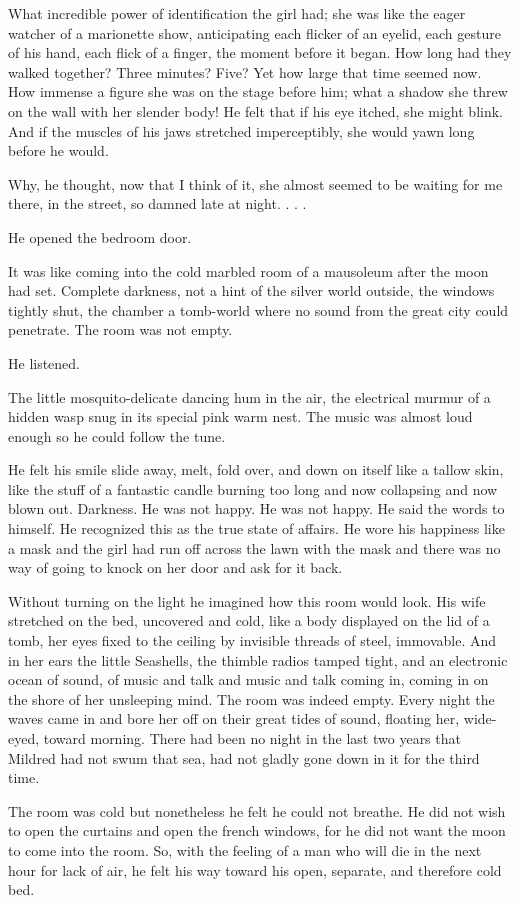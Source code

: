 \documentclass[10pt,a4paper]{article}
\begin{document}
What incredible power of identification the girl had; 
she was like the eager watcher of a marionette show, 
anticipating each flicker of an eyelid, each gesture of his 
hand, each flick of a finger, the moment before it began. 
How long had they walked together? Three minutes? Five? 
Yet how large that time seemed now. How immense a figure 
she was on the stage before him; what a shadow she threw 
on the wall with her slender body! He felt that if his eye 
itched, she might blink. And if the muscles of his jaws 
stretched imperceptibly, she would yawn long before he 
would. 

Why, he thought, now that I think of it, she almost 
seemed to be waiting for me there, in the street, so damned 
late at night. . . . 

He opened the bedroom door. 

It was like coming into the cold marbled room of a 
mausoleum after the moon had set. Complete darkness, not 
a hint of the silver world outside, the windows tightly shut, 
the chamber a tomb-world where no sound from the great 
city could penetrate. The room was not empty. 

He listened. 

The little mosquito-delicate dancing hum in the air, 
the electrical murmur of a hidden wasp snug in its special 
pink warm nest. The music was almost loud enough so he 
could follow the tune. 

He felt his smile slide away, melt, fold over, and down 
on itself like a tallow skin, like the stuff of a fantastic candle 
burning too long and now collapsing and now blown out. 
Darkness. He was not happy. He was not happy. He said the 
words to himself. He recognized this as the true state of 
affairs. He wore his happiness like a mask and the girl had 
run off across the lawn with the mask and there was no way 
of going to knock on her door and ask for it back. 

Without turning on the light he imagined how this 
room would look. His wife stretched on the bed, uncovered 
and cold, like a body displayed on the lid of a tomb, her eyes 
fixed to the ceiling by invisible threads of steel, immovable. 
And in her ears the little Seashells, the thimble radios 
tamped tight, and an electronic ocean of sound, of music 
and talk and music and talk coming in, coming in on the 
shore of her unsleeping mind. The room was indeed empty. 
Every night the waves came in and bore her off on their 
great tides of sound, floating her, wide-eyed, toward 
morning. There had been no night in the last two years that 
Mildred had not swum that sea, had not gladly gone down in 
it for the third time. 

The room was cold but nonetheless he felt he could 
not breathe. He did not wish to open the curtains and open 
the french windows, for he did not want the moon to come 
into the room. So, with the feeling of a man who will die in 
the next hour for lack of air, he felt his way toward his open, 
separate, and therefore cold bed.
\end{document}
